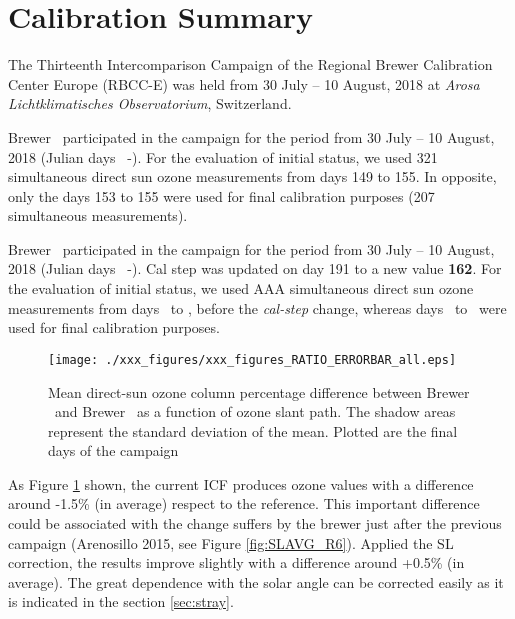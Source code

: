

\section{Calibration Summary}
The Thirteenth Intercomparison Campaign of the Regional Brewer Calibration Center Europe (RBCC-E) was held from 30 July – 10 August, 2018 at \textit{Arosa Lichtklimatisches Observatorium}, Switzerland.

Brewer \brwname\ participated in the campaign for the period from 30 July – 10 August, 2018 (Julian days \CALINI\ -\CALEND). 
For the evaluation of initial status, we used 321 simultaneous direct sun ozone measurements from days 149 to 155. In opposite, only the days 153 to 155 were used for final calibration purposes (207 simultaneous measurements).



Brewer \brwname\ participated in the campaign for the period from 30 July – 10 August, 2018 (Julian days \CALINI\ -\CALEND). Cal step was updated on day 191 to a new value \textbf{162}. For the evaluation of initial status, we used AAA simultaneous direct sun ozone measurements from days \textbf{\BLINDINI}\ to \textbf{\BLINDEND}, before the \emph{cal-step} change, whereas days \FINALINI\ to \FINALEND\ were used for final calibration purposes.

 \begin{figure}[htp!]
 \begin{center}
		\texttt{[image: ./xxx\_figures/xxx\_figures\_RATIO\_ERRORBAR\_all.eps]}
		\caption{Mean direct-sun ozone column percentage difference between Brewer \brwname\ and Brewer \brwref\ as a function of ozone slant path. The shadow areas represent the standard deviation of the mean. Plotted are the final days of the campaign}
		\label{fig:RATIO_ERRORBAR_summary}
 \end{center}
 \end{figure}


As Figure \ref{fig:RATIO_ERRORBAR_summary} shown, the current ICF produces ozone values with a difference around -1.5\% (in average) respect to the reference. This important difference could be associated with the change suffers by the brewer just after the previous campaign (Arenosillo 2015, see Figure \ref{fig:SLAVG_R6}). Applied the SL correction, the results improve slightly with a difference around +0.5\% (in average). The great dependence with the solar angle can be corrected easily as it is indicated in the section \ref{sec:stray}. 

